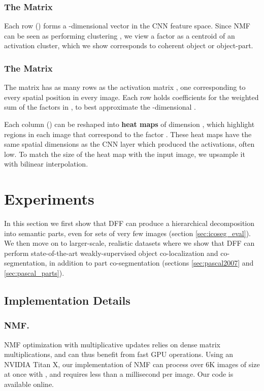 \documentclass[runningheads]{llncs}
\begin{document}
	\subsubsection{The  Matrix}
	Each row  () forms a -dimensional vector in the CNN feature space. Since NMF can be seen as performing clustering \cite{ding2005equivalence}, we view a factor  as a centroid of an activation cluster, which we show corresponds to coherent object or object-part.
	
	\subsubsection{The  Matrix}
	The matrix  has as many rows as the activation matrix , one corresponding to every spatial position in every image. Each row  holds coefficients for the weighted sum of the  factors in , to best approximate the -dimensional .
	
	Each column  () can be reshaped into  \textbf{heat maps} of dimension , which highlight regions in each image that correspond to the factor . These heat maps have the same spatial dimensions as the CNN layer which produced the activations, often low. To match the size of the heat map with the input image, we upsample it with bilinear interpolation.

	\section{Experiments} \label{sec:experiments}
	
	In this section we first show that DFF can produce a hierarchical decomposition into semantic parts, even for sets of very few images (section \ref{sec:icoseg_eval}). We then move on to larger-scale, realistic datasets where we show that DFF can perform state-of-the-art weakly-supervised object co-localization and co-segmentation, in addition to part co-segmentation (sections \ref{sec:pascal2007} and \ref{sec:pascal_parts}).

	\subsection{Implementation Details}

	\subsubsection{NMF.} NMF optimization with multiplicative updates \cite{lee2001algorithms} relies on dense matrix multiplications, and can thus benefit from fast GPU operations. Using an NVIDIA Titan X, our implementation of NMF can process over 6K images of size  at once with ,  and requires less than a millisecond per image. Our code is available online.
\end{document}
